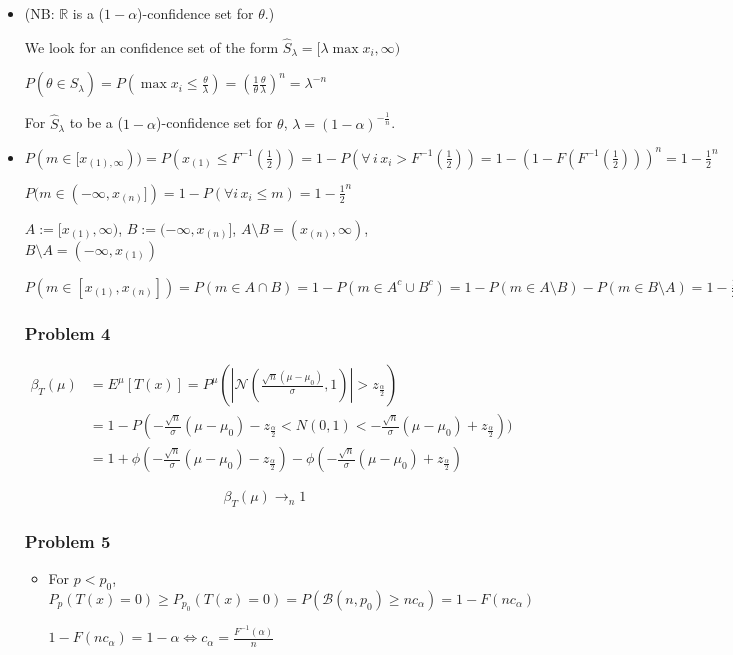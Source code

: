 \documentclass[12pt]{article}
\newcommand{\Q}[1]{\subsubsection*{Problem #1}}
\newcommand{\union}[1]{\underset{#1}{\cup} }
\newcommand{\inter}[1]{\underset{#1}{\cap} }
\begin{document}
\begin{itemize}
\item

(NB: $\mathbb R$ is a ($1-\alpha$)-confidence set for $\theta$.)


We look for an confidence set of the form 
$\hat S_{\lambda} = [\lambda \max x_i, \infty)$


$P(\theta \in \hat S_{\lambda}) = P(\max x_i \le \frac{\theta}{\lambda}) = (\frac 1 {\theta} \frac{\theta}{\lambda})^n = \lambda^{-n}$

For $\hat S_{\lambda}$ to be  a ($1-\alpha$)-confidence set for $\theta$, $\lambda = (1-\alpha)^{-\frac1 n}$.


\item $P(m \in [x_{(1), \infty})) = P(x_{(1)} \leq F^{-1}(\frac 1 2)) = 1 - P(\forall \, i \, x_i > F^{-1}(\frac 1 2)) = 1 - (1 - F(F^{-1}(\frac 1 2)))^n = 1 - \frac 1 2^n$


$P(m \in (- \infty, x_{(n)}]) = 1 - P(\forall i \, x_i \leq m) = 1 - \frac 1 2^n$

$A := [x_{(1)}, \infty)$, $B := (- \infty, x_{(n)}]$, $A \setminus B = (x_{(n)}, \infty)$, $B \setminus A = (- \infty, x_{(1)}) $


$P(m \in [x_{(1)}, x_{(n)}]) = P(m \in A \inter{} B) = 1 - P(m \in A^c \union{} B^c) = 1 - P(m \in A \setminus B) - P(m \in B \setminus A) = 1 - \frac 1 2^{n-1}$


\Q{4}

\begin{align}
\beta_T(\mu) &= E^{\mu}[T(x)] = P^{\mu}(|\mathcal N(\frac{\sqrt n(\mu - \mu_0)}{\sigma}, 1)| > z_{\frac{\alpha}2})
\\&= 1 - P(-\frac{\sqrt n}{\sigma}(\mu-\mu_0) - z_{\frac{\alpha}2} < N(0, 1) < -\frac{\sqrt n}{\sigma}(\mu-\mu_0) + z_{\frac{\alpha}2}))
\\&=  1 + \phi( - \frac{\sqrt n}{\sigma}(\mu-\mu_0) - z_{\frac{\alpha}2}) - \phi( - \frac{\sqrt n}{\sigma}(\mu-\mu_0) + z_{\frac{\alpha}2})
\end{align}

$$\beta_T(\mu) \rightarrow_n 1$$


\Q{5}

\begin{itemize}
\item For $p < p_0$, $P_p(T(x) = 0) \geq P_{p_0}(T(x) = 0) = P( \mathcal B(n, p_0) \ge n c_{\alpha}) = 1 - F(n c_{\alpha})$

$ 1 - F(n c_{\alpha}) = 1 - \alpha \iff c_{\alpha} = \frac{F^{-1}(\alpha)}{n} $


\end{itemize}
\end{itemize}
\end{document}

